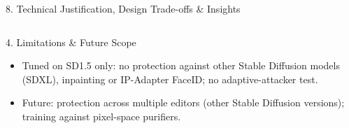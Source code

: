 \documentclass[aspectratio=169, 11pt]{beamer}
\begin{document}
\begin{frame}{8. Technical Justification, Design Trade-offs \& Insights}
\begin{columns}[T]
        \begin{block}{4. Limitations \& Future Scope}
            \scriptsize
            \begin{itemize}
                \item Tuned on SD1.5 only: no protection against other Stable Diffusion models (SDXL), inpainting or IP-Adapter FaceID; no adaptive-attacker test.
                \item Future: protection across multiple editors (other Stable Diffusion versions); training against pixel-space purifiers.
            \end{itemize}
        \end{block}
    \end{columns}
\end{frame}

\end{document}
